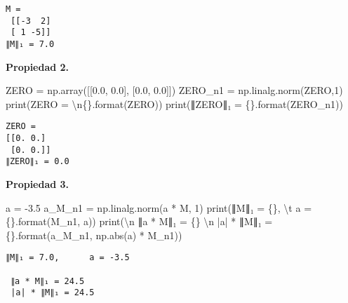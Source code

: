 \documentclass[
  letterpaper,
  DIV=11,
  numbers=noendperiod]{scrreprt}
\newenvironment{Shaded}{\begin{snugshade}}{\end{snugshade}}
\newcommand{\BuiltInTok}[1]{\textcolor[rgb]{0.00,0.23,0.31}{#1}}
\newcommand{\CharTok}[1]{\textcolor[rgb]{0.13,0.47,0.30}{#1}}
\newcommand{\DecValTok}[1]{\textcolor[rgb]{0.68,0.00,0.00}{#1}}
\newcommand{\FloatTok}[1]{\textcolor[rgb]{0.68,0.00,0.00}{#1}}
\newcommand{\NormalTok}[1]{\textcolor[rgb]{0.00,0.23,0.31}{#1}}
\newcommand{\OperatorTok}[1]{\textcolor[rgb]{0.37,0.37,0.37}{#1}}
\newcommand{\SpecialCharTok}[1]{\textcolor[rgb]{0.37,0.37,0.37}{#1}}
\newcommand{\StringTok}[1]{\textcolor[rgb]{0.13,0.47,0.30}{#1}}
\begin{document}
\begin{verbatim}
M =
 [[-3  2]
 [ 1 -5]]
∥M∥₁ = 7.0
\end{verbatim}

\textbf{Propiedad 2.}

\begin{Shaded}
\begin{Highlighting}[]
\NormalTok{ZERO }\OperatorTok{=}\NormalTok{ np.array([[}\FloatTok{0.0}\NormalTok{, }\FloatTok{0.0}\NormalTok{], [}\FloatTok{0.0}\NormalTok{, }\FloatTok{0.0}\NormalTok{]])}
\NormalTok{ZERO\_n1 }\OperatorTok{=}\NormalTok{ np.linalg.norm(ZERO,}\DecValTok{1}\NormalTok{)}
\BuiltInTok{print}\NormalTok{(}\StringTok{\textquotesingle{}ZERO = }\CharTok{\textbackslash{}n}\SpecialCharTok{\{\}}\StringTok{\textquotesingle{}}\NormalTok{.}\BuiltInTok{format}\NormalTok{(ZERO))}
\BuiltInTok{print}\NormalTok{(}\StringTok{\textquotesingle{}∥ZERO∥₁ = }\SpecialCharTok{\{\}}\StringTok{\textquotesingle{}}\NormalTok{.}\BuiltInTok{format}\NormalTok{(ZERO\_n1))}
\end{Highlighting}
\end{Shaded}

\begin{verbatim}
ZERO = 
[[0. 0.]
 [0. 0.]]
∥ZERO∥₁ = 0.0
\end{verbatim}

\textbf{Propiedad 3.}

\begin{Shaded}
\begin{Highlighting}[]
\NormalTok{a }\OperatorTok{=} \OperatorTok{{-}}\FloatTok{3.5}
\NormalTok{a\_M\_n1 }\OperatorTok{=}\NormalTok{ np.linalg.norm(a }\OperatorTok{*}\NormalTok{ M, }\DecValTok{1}\NormalTok{) }
\BuiltInTok{print}\NormalTok{(}\StringTok{\textquotesingle{}∥M∥₁ = }\SpecialCharTok{\{\}}\StringTok{, }\CharTok{\textbackslash{}t}\StringTok{ a = }\SpecialCharTok{\{\}}\StringTok{\textquotesingle{}}\NormalTok{.}\BuiltInTok{format}\NormalTok{(M\_n1, a))}
\BuiltInTok{print}\NormalTok{(}\StringTok{\textquotesingle{}}\CharTok{\textbackslash{}n}\StringTok{ ∥a * M∥₁ = }\SpecialCharTok{\{\}}\StringTok{ }\CharTok{\textbackslash{}n}\StringTok{ |a| * ∥M∥₁ = }\SpecialCharTok{\{\}}\StringTok{\textquotesingle{}}\NormalTok{.}\BuiltInTok{format}\NormalTok{(a\_M\_n1, np.}\BuiltInTok{abs}\NormalTok{(a) }\OperatorTok{*}\NormalTok{ M\_n1))}
\end{Highlighting}
\end{Shaded}

\begin{verbatim}
∥M∥₁ = 7.0,      a = -3.5

 ∥a * M∥₁ = 24.5 
 |a| * ∥M∥₁ = 24.5
\end{verbatim}
\end{document}
